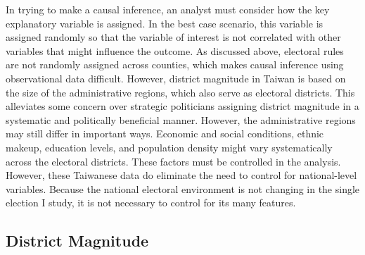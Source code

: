 \documentclass[12pt]{article}
\begin{document}
In trying to make a causal inference, an analyst must consider how the key explanatory variable is assigned. In the best case scenario, this variable is assigned randomly so that the variable of interest is not correlated with other variables that might influence the outcome. As discussed above, electoral rules are not randomly assigned across counties, which makes causal inference using observational data difficult. However, district magnitude in Taiwan is based on the size of the administrative regions, which also serve as electoral districts. This alleviates some concern over strategic politicians assigning district magnitude in a systematic and politically beneficial manner. However, the administrative regions may still differ in important ways. Economic and social conditions, ethnic makeup, education levels, and population density might vary systematically across the electoral districts. These factors must be controlled in the analysis. However, these Taiwanese data do eliminate the need to control for national-level variables. Because the national electoral environment is not changing in the single election I study, it is not necessary to control for its many features.

\subsection*{District Magnitude} 
\end{document}
